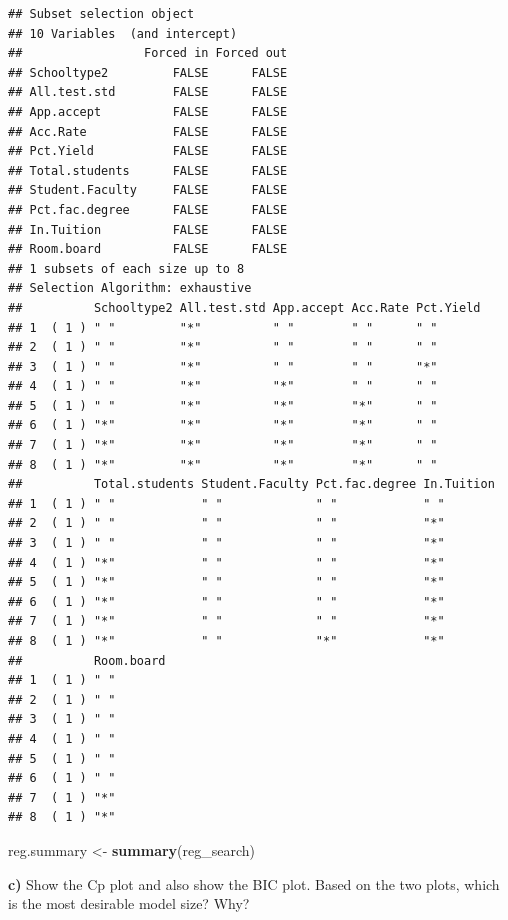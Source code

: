 \documentclass[]{article}
\newenvironment{Shaded}{\begin{snugshade}}{\end{snugshade}}
\newcommand{\KeywordTok}[1]{\textcolor[rgb]{0.13,0.29,0.53}{\textbf{#1}}}
\newcommand{\StringTok}[1]{\textcolor[rgb]{0.31,0.60,0.02}{#1}}
\newcommand{\NormalTok}[1]{#1}
\begin{document}
\begin{verbatim}
## Subset selection object
## 10 Variables  (and intercept)
##                 Forced in Forced out
## Schooltype2         FALSE      FALSE
## All.test.std        FALSE      FALSE
## App.accept          FALSE      FALSE
## Acc.Rate            FALSE      FALSE
## Pct.Yield           FALSE      FALSE
## Total.students      FALSE      FALSE
## Student.Faculty     FALSE      FALSE
## Pct.fac.degree      FALSE      FALSE
## In.Tuition          FALSE      FALSE
## Room.board          FALSE      FALSE
## 1 subsets of each size up to 8
## Selection Algorithm: exhaustive
##          Schooltype2 All.test.std App.accept Acc.Rate Pct.Yield
## 1  ( 1 ) " "         "*"          " "        " "      " "      
## 2  ( 1 ) " "         "*"          " "        " "      " "      
## 3  ( 1 ) " "         "*"          " "        " "      "*"      
## 4  ( 1 ) " "         "*"          "*"        " "      " "      
## 5  ( 1 ) " "         "*"          "*"        "*"      " "      
## 6  ( 1 ) "*"         "*"          "*"        "*"      " "      
## 7  ( 1 ) "*"         "*"          "*"        "*"      " "      
## 8  ( 1 ) "*"         "*"          "*"        "*"      " "      
##          Total.students Student.Faculty Pct.fac.degree In.Tuition
## 1  ( 1 ) " "            " "             " "            " "       
## 2  ( 1 ) " "            " "             " "            "*"       
## 3  ( 1 ) " "            " "             " "            "*"       
## 4  ( 1 ) "*"            " "             " "            "*"       
## 5  ( 1 ) "*"            " "             " "            "*"       
## 6  ( 1 ) "*"            " "             " "            "*"       
## 7  ( 1 ) "*"            " "             " "            "*"       
## 8  ( 1 ) "*"            " "             "*"            "*"       
##          Room.board
## 1  ( 1 ) " "       
## 2  ( 1 ) " "       
## 3  ( 1 ) " "       
## 4  ( 1 ) " "       
## 5  ( 1 ) " "       
## 6  ( 1 ) " "       
## 7  ( 1 ) "*"       
## 8  ( 1 ) "*"
\end{verbatim}

\begin{Shaded}
\begin{Highlighting}[]
\NormalTok{reg.summary <-}\StringTok{ }\KeywordTok{summary}\NormalTok{(reg_search)}
\end{Highlighting}
\end{Shaded}

\textbf{c)} Show the Cp plot and also show the BIC plot. Based on the
two plots, which is the most desirable model size? Why?
\end{document}
